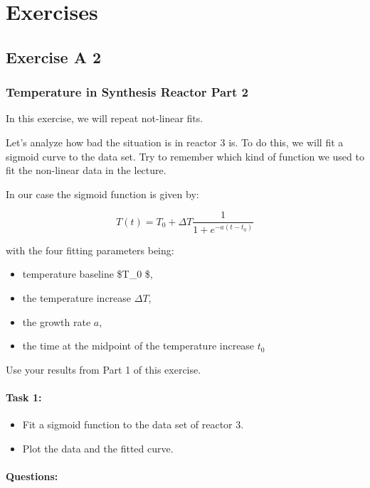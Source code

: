 \documentclass[
  letterpaper,
  DIV=11,
  numbers=noendperiod]{scrreprt}
\providecommand{\tightlist}{%
  \setlength{\itemsep}{0pt}\setlength{\parskip}{0pt}}\usepackage{longtable,booktabs,array}
\begin{document}
\part{Exercises}

\chapter{Exercise A 2}\label{exercise-a-2}

\section{Temperature in Synthesis Reactor Part
2}\label{temperature-in-synthesis-reactor-part-2}

In this exercise, we will repeat not-linear fits.

Let's analyze how bad the situation is in reactor 3 is. To do this, we
will fit a sigmoid curve to the data set. Try to remember which kind of
function we used to fit the non-linear data in the lecture.

In our case the sigmoid function is given by:

\[
T(t) = T_0 + \Delta T \frac{1}{1 + e^{-a (t - t_0)}}
\]

with the four fitting parameters being:

\begin{itemize}
\tightlist
\item
  temperature baseline \$T\_0 \$,
\item
  the temperature increase \(\Delta T\),
\item
  the growth rate \(a\),
\item
  the time at the midpoint of the temperature increase \(t_0\)
\end{itemize}

Use your results from Part 1 of this exercise.

\subsection{Task 1:}\label{task-1}

\begin{itemize}
\tightlist
\item
  Fit a sigmoid function to the data set of reactor 3.
\item
  Plot the data and the fitted curve.
\end{itemize}

\subsection{Questions:}\label{questions-1}
\end{document}
